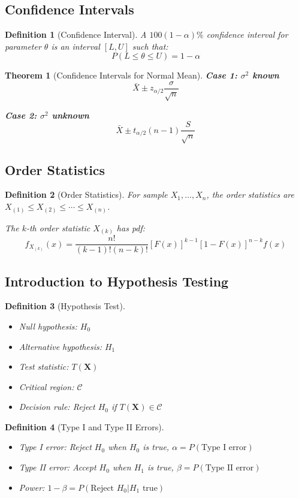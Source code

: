 \documentclass[12pt,a4paper]{amsart}
\newtheorem{theorem}{Theorem}[section]
\newtheorem{definition}{Definition}[section]
\theoremstyle{remark}
\begin{document}
\subsection{Confidence Intervals}

\begin{definition}[Confidence Interval]
A $100(1-\alpha)\%$ confidence interval for parameter $\theta$ is an interval $[L, U]$ such that:
$$P(L \leq \theta \leq U) = 1-\alpha$$
\end{definition}

\begin{theorem}[Confidence Intervals for Normal Mean]
\textbf{Case 1: $\sigma^2$ known}
$$\bar{X} \pm z_{\alpha/2} \frac{\sigma}{\sqrt{n}}$$

\textbf{Case 2: $\sigma^2$ unknown}
$$\bar{X} \pm t_{\alpha/2}(n-1) \frac{S}{\sqrt{n}}$$
\end{theorem}

\subsection{Order Statistics}

\begin{definition}[Order Statistics]
For sample $X_1, \ldots, X_n$, the order statistics are $X_{(1)} \leq X_{(2)} \leq \cdots \leq X_{(n)}$.

The $k$-th order statistic $X_{(k)}$ has pdf:
$$f_{X_{(k)}}(x) = \frac{n!}{(k-1)!(n-k)!} [F(x)]^{k-1} [1-F(x)]^{n-k} f(x)$$
\end{definition}

\subsection{Introduction to Hypothesis Testing}

\begin{definition}[Hypothesis Test]
\begin{itemize}
\item Null hypothesis: $H_0$
\item Alternative hypothesis: $H_1$
\item Test statistic: $T(\mathbf{X})$
\item Critical region: $\mathcal{C}$
\item Decision rule: Reject $H_0$ if $T(\mathbf{X}) \in \mathcal{C}$
\end{itemize}
\end{definition}

\begin{definition}[Type I and Type II Errors]
\begin{itemize}
\item Type I error: Reject $H_0$ when $H_0$ is true, $\alpha = P(\text{Type I error})$
\item Type II error: Accept $H_0$ when $H_1$ is true, $\beta = P(\text{Type II error})$
\item Power: $1 - \beta = P(\text{Reject } H_0 | H_1 \text{ true})$
\end{itemize}
\end{definition}
\end{document}
